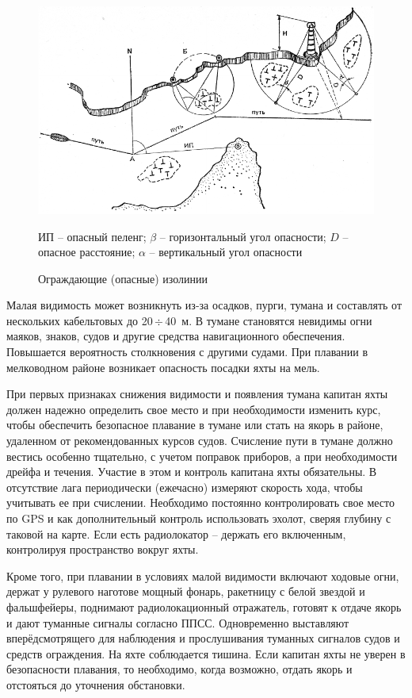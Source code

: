 \documentclass[a4paper, 12pt, twoside, final, book, russian, fittopage, cyremdash]{ncc}
\newcommand{\otdo}{\,\ensuremath{\div}\,}
\begin{document}
\begin{figure}[htb]
  \centering{}
  \includegraphics{0086P}
  \caption{Ограждающие (опасные) изолинии}
  \label{fig:N86}
  \small
  \centering{}
  ИП \--- опасный пеленг; $\beta$ \--- горизонтальный угол опасности; $D$ \--- опасное расстояние; $\alpha$ \--- вертикальный угол опасности
\end{figure}

Малая видимость может возникнуть из-за осадков, пурги, тумана и составлять от нескольких кабельтовых до 20\otdo 40~м. В тумане становятся невидимы огни маяков, знаков, судов и другие средства навигационного обеспечения. Повышается вероятность столкновения с другими судами. При плавании в мелководном районе возникает опасность посадки яхты на мель.
 
При первых признаках снижения видимости и появления тумана капитан яхты должен надежно определить свое место и при необходимости изменить курс, чтобы обеспечить безопасное плавание в тумане или стать на якорь в районе, удаленном от рекомендованных курсов судов. Счисление пути в тумане должно вестись особенно тщательно, с учетом поправок приборов, а при необходимости дрейфа и течения. Участие в этом и контроль капитана яхты обязательны. В отсутствие лага периодически (ежечасно) измеряют скорость хода, чтобы учитывать ее при счислении. Необходимо постоянно контролировать свое место по GPS и как дополнительный контроль использовать эхолот, сверяя глубину с таковой на карте. Если есть радиолокатор \--- держать его включенным, контролируя пространство вокруг яхты.
 
Кроме того, при плавании в условиях малой видимости включают ходовые огни, держат у рулевого наготове мощный фонарь, ракетницу с белой звездой и фальшфейеры, поднимают радиолокационный отражатель, готовят к отдаче якорь и дают туманные сигналы согласно ППСС. Одновременно выставляют вперёдсмотрящего для наблюдения и прослушивания туманных сигналов судов и средств ограждения. На яхте соблюдается тишина. Если капитан яхты не уверен в безопасности плавания, то необходимо, когда возможно, отдать якорь и отстояться до уточнения обстановки.
 
\end{document}
